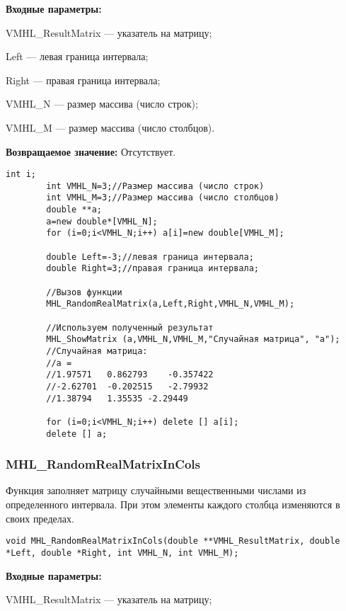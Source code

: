 \documentclass[a4paper,12pt]{article}
\begin{document}
\textbf{Входные параметры:}

 VMHL\_ResultMatrix --- указатель на матрицу;
 
 Left --- левая граница интервала;
 
 Right --- правая граница интервала;
 
 VMHL\_N --- размер массива (число строк);
 
 VMHL\_M --- размер массива (число столбцов).

\textbf{Возвращаемое значение:}
Отсутствует.


\begin{lstlisting}[label=code_use_MHL_RandomRealMatrix,caption=Пример использования]
        int i;
        int VMHL_N=3;//Размер массива (число строк)
        int VMHL_M=3;//Размер массива (число столбцов)
        double **a;
        a=new double*[VMHL_N];
        for (i=0;i<VMHL_N;i++) a[i]=new double[VMHL_M];

        double Left=-3;//левая граница интервала;
        double Right=3;//правая граница интервала;

        //Вызов функции
        MHL_RandomRealMatrix(a,Left,Right,VMHL_N,VMHL_M);

        //Используем полученный результат
        MHL_ShowMatrix (a,VMHL_N,VMHL_M,"Случайная матрица", "a");
        //Случайная матрица:
        //a =
        //1.97571	0.862793	-0.357422
        //-2.62701	-0.202515	-2.79932
        //1.38794	1.35535	-2.29449

        for (i=0;i<VMHL_N;i++) delete [] a[i];
        delete [] a;
\end{lstlisting}

\subsubsection{MHL\_RandomRealMatrixInCols}\label{MHL_RandomRealMatrixInCols}

Функция заполняет матрицу случайными вещественными числами из определенного интервала. При этом элементы каждого столбца изменяются в своих пределах.


\begin{lstlisting}[label=code_syntax_MHL_RandomRealMatrixInCols,caption=Синтаксис]
void MHL_RandomRealMatrixInCols(double **VMHL_ResultMatrix, double *Left, double *Right, int VMHL_N, int VMHL_M);
\end{lstlisting}

\textbf{Входные параметры:}

 VMHL\_ResultMatrix --- указатель на матрицу;
 
\end{document}
